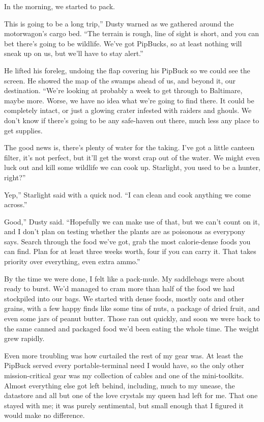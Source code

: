 In the morning, we started to pack.

\leavevmode{}This is going to be a long trip,” Dusty warned as we gathered around the motorwagon’s cargo bed. “The terrain is rough, line of sight is short, and you can bet there’s going to be wildlife. We’ve got PipBucks, so at least nothing will sneak up on us, but we’ll have to stay alert.”

He lifted his foreleg, undoing the flap covering his PipBuck so we could see the screen. He showed the map of the swamps ahead of us, and beyond it, our destination. “We’re looking at probably a week to get through to Baltimare, maybe more. Worse, we have no idea what we’re going to find there. It could be completely intact, or just a glowing crater infested with raiders and ghouls. We don’t know if there’s going to be any safe-haven out there, much less any place to get supplies.

\leavevmode{}The good news is, there’s plenty of water for the taking. I’ve got a little canteen filter, it’s not perfect, but it’ll get the worst crap out of the water. We might even luck out and kill some wildlife we can cook up. Starlight, you used to be a hunter, right?”

\leavevmode{}Yep,” Starlight said with a quick nod. “I can clean and cook anything we come across.”

\leavevmode{}Good,” Dusty said. “Hopefully we can make use of that, but we can’t count on it, and I don’t plan on testing whether the plants are as poisonous as everypony says. Search through the food we’ve got, grab the most calorie-dense foods you can find. Plan for at least three weeks worth, four if you can carry it. That takes priority over everything, even extra ammo.”

By the time we were done, I felt like a pack-mule. My saddlebags were about ready to burst. We’d managed to cram more than half of the food we had stockpiled into our bags. We started with dense foods, mostly oats and other grains, with a few happy finds like some tins of nuts, a package of dried fruit, and even some jars of peanut butter. Those ran out quickly, and soon we were back to the same canned and packaged food we’d been eating the whole time. The weight grew rapidly.

Even more troubling was how curtailed the rest of my gear was. At least the PipBuck served every portable-terminal need I would have, so the only other mission-critical gear was my collection of cables and one of the mini-toolkits. Almost everything else got left behind, including, much to my unease, the datastore and all but one of the love crystals my queen had left for me. That one stayed with me; it was purely sentimental, but small enough that I figured it would make no difference.

